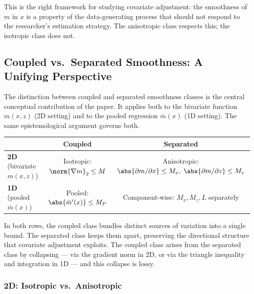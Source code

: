 This is the right framework for studying covariate adjustment: the smoothness of $m$ in $x$ is a property of the data-generating process that should not respond to the researcher's estimation strategy.
The anisotropic class respects this; the isotropic class does not.


\subsection{Coupled vs.\ Separated Smoothness: A Unifying Perspective}\label{sec:overview:epistemology}

The distinction between coupled and separated smoothness classes is the central conceptual contribution of the paper.
It applies both to the bivariate function $m(x,z)$ (2D setting) and to the pooled regression $\bar{m}(x)$ (1D setting).
The same epistemological argument governs both.

\begin{center}
\begin{tabular}{lcc}
\toprule
& \textbf{Coupled} & \textbf{Separated} \\
\midrule
\textbf{2D} (bivariate $m(x,z)$) & Isotropic: $\norm{\nabla m}_2 \leq M$ & Anisotropic: $\abs{\partial m / \partial x} \leq M_x,\; \abs{\partial m / \partial z} \leq M_z$ \\
\textbf{1D} (pooled $\bar{m}(x)$) & Pooled: $\abs{\bar{m}'(x)} \leq M_P$ & Component-wise: $M_x, M_z, L$ separately \\
\bottomrule
\end{tabular}
\end{center}

In both rows, the coupled class bundles distinct sources of variation into a single bound.
The separated class keeps them apart, preserving the directional structure that covariate adjustment exploits.
The coupled class arises from the separated class by collapsing --- via the gradient norm in 2D, or via the triangle inequality and integration in 1D --- and this collapse is lossy.


\subsubsection*{2D: Isotropic vs.\ Anisotropic}

